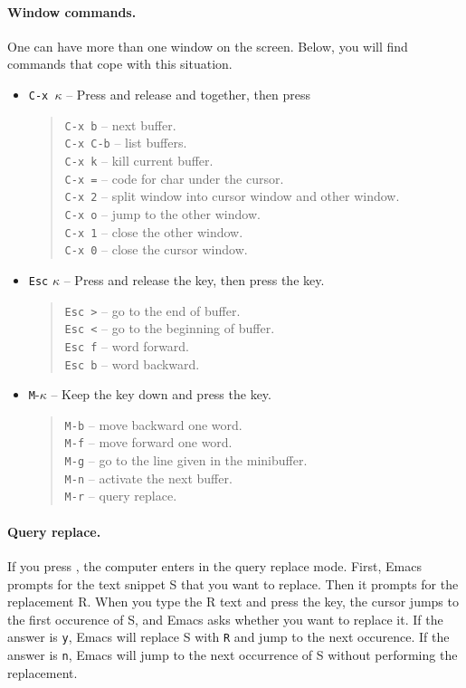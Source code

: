 \documentclass[a4paper,12pt]{book}
\begin{document}
\paragraph{Window commands.} One can have more
than one window on the screen. Below, you will
find commands that cope with this situation.
\begin{itemize}
\item \verb|C-x |$\kappa$ -- Press and release 
and  together, then press \keys{$\kappa$} 
\begin{quote}
\verb|C-x b| -- next buffer.\\
\verb|C-x C-b| -- list buffers.\\
\verb|C-x k| -- kill current buffer.\\
\verb|C-x =| -- code for char under the cursor.\\
\verb|C-x 2| -- split window into cursor window and other window.\\
\verb|C-x o| -- jump to the other window.\\
\verb|C-x 1| -- close the other window.\\
\verb|C-x 0| -- close the cursor window.
\end{quote}
\item \verb|Esc| $\kappa$ -- Press and release the  key,
then press the \keys{$\kappa$} key.
\begin{quote}
\verb|Esc >| -- go to the end of buffer.\\
\verb|Esc <| -- go to the beginning of buffer.\\ 
\verb|Esc f| -- word forward.\\
\verb|Esc b| -- word backward.\\
\end{quote}
\item \verb|M|-$\kappa$ -- Keep the  key
down and press the \keys{$\kappa$} key.
\begin{quote}
\verb|M-b| -- move backward one word.\\
\verb|M-f| -- move forward one word.\\
\verb|M-g| -- go to the line given in the minibuffer.\\
\verb|M-n| -- activate the next buffer.\\
\verb|M-r| -- query replace.
\end{quote}
\end{itemize}

\paragraph{Query replace.} If you press \keys{\%},
the computer enters in the query replace mode.
First, Emacs prompts for the text snippet S
that you want to replace. Then it prompts for
the replacement R. When you type the R text and
press the  key, the cursor jumps to
the first occurence of S, and Emacs asks whether
you want to replace it. If the answer is \verb|y|,
Emacs will replace S with \verb|R| and jump to
the next occurence. If the answer is \verb|n|,
Emacs will jump to the next occurrence of S without
performing the replacement.
\end{document}
